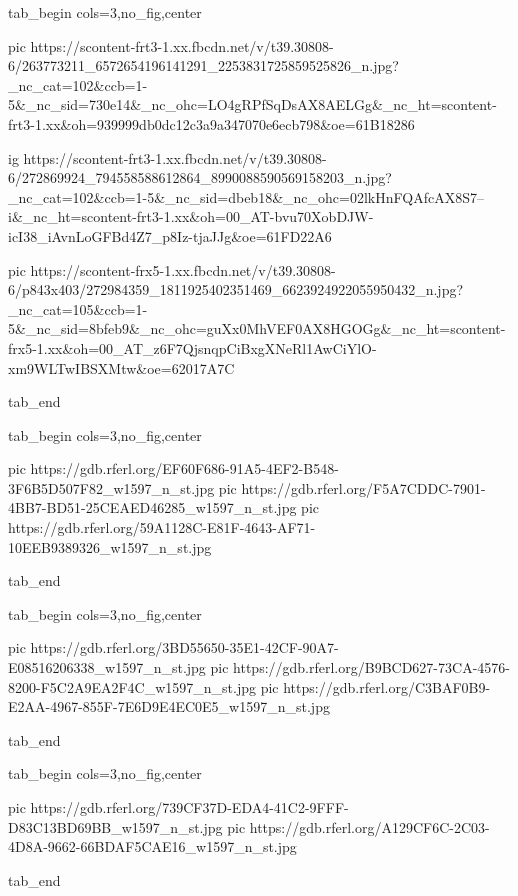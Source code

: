  
 
 
 
 

\ifcmt

  tab_begin cols=3,no_fig,center

    pic https://scontent-frt3-1.xx.fbcdn.net/v/t39.30808-6/263773211_6572654196141291_2253831725859525826_n.jpg?_nc_cat=102&ccb=1-5&_nc_sid=730e14&_nc_ohc=LO4gRPfSqDsAX8AELGg&_nc_ht=scontent-frt3-1.xx&oh=939999db0dc12c3a9a347070e6ecb798&oe=61B18286
  
    ig https://scontent-frt3-1.xx.fbcdn.net/v/t39.30808-6/272869924_794558588612864_8990088590569158203_n.jpg?_nc_cat=102&ccb=1-5&_nc_sid=dbeb18&_nc_ohc=02lkHnFQAfcAX8S7--i&_nc_ht=scontent-frt3-1.xx&oh=00_AT-bvu70XobDJW-icI38_iAvnLoGFBd4Z7_p8Iz-tjaJJg&oe=61FD22A6
  
    pic https://scontent-frx5-1.xx.fbcdn.net/v/t39.30808-6/p843x403/272984359_1811925402351469_6623924922055950432_n.jpg?_nc_cat=105&ccb=1-5&_nc_sid=8bfeb9&_nc_ohc=guXx0MhVEF0AX8HGOGg&_nc_ht=scontent-frx5-1.xx&oh=00_AT_z6F7QjsnqpCiBxgXNeRl1AwCiYlO-xm9WLTwIBSXMtw&oe=62017A7C

  tab_end

  tab_begin cols=3,no_fig,center

    pic https://gdb.rferl.org/EF60F686-91A5-4EF2-B548-3F6B5D507F82_w1597_n_st.jpg
    pic https://gdb.rferl.org/F5A7CDDC-7901-4BB7-BD51-25CEAED46285_w1597_n_st.jpg
    pic https://gdb.rferl.org/59A1128C-E81F-4643-AF71-10EEB9389326_w1597_n_st.jpg

  tab_end

  tab_begin cols=3,no_fig,center

    pic https://gdb.rferl.org/3BD55650-35E1-42CF-90A7-E08516206338_w1597_n_st.jpg
    pic https://gdb.rferl.org/B9BCD627-73CA-4576-8200-F5C2A9EA2F4C_w1597_n_st.jpg
    pic https://gdb.rferl.org/C3BAF0B9-E2AA-4967-855F-7E6D9E4EC0E5_w1597_n_st.jpg

  tab_end

  tab_begin cols=3,no_fig,center

    pic https://gdb.rferl.org/739CF37D-EDA4-41C2-9FFF-D83C13BD69BB_w1597_n_st.jpg
    pic https://gdb.rferl.org/A129CF6C-2C03-4D8A-9662-66BDAF5CAE16_w1597_n_st.jpg

  tab_end

\fi
